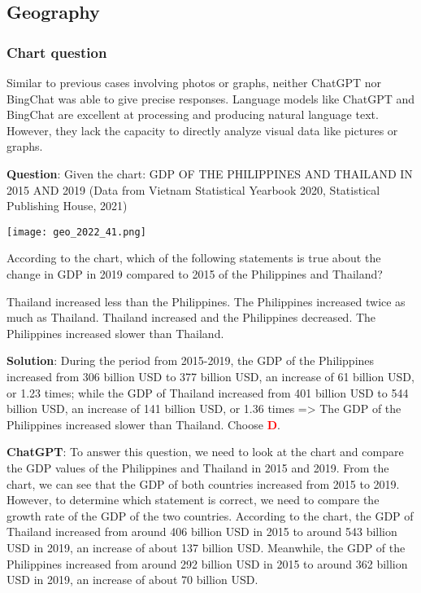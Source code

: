 \documentclass{article}
\begin{document}
{\begin{mdframed}[linewidth=1pt,linecolor=red]
	\end{mdframed}
	
	\subsection{Geography}
	
	\label{VNHSGE_Geo}
	
	\subsubsection{Chart question}
	
	\label{VNHSGE_Geo_Chart}
	
	Similar to previous cases involving photos or graphs, neither ChatGPT nor BingChat was able to give precise responses. Language models like ChatGPT and BingChat are excellent at processing and producing natural language text. However, they lack the capacity to directly analyze visual data like pictures or graphs.
	
	
	\begin{mdframed}[linewidth=1pt,linecolor=red] \textbf{Question}: Given the chart: GDP OF THE PHILIPPINES AND THAILAND IN 2015 AND 2019
		(Data from Vietnam Statistical Yearbook 2020, Statistical Publishing House, 2021)
		
		\texttt{[image: geo\_2022\_41.png]}
		
		According to the chart, which of the following statements is true about the change in GDP in 2019 compared to 2015 of the Philippines and Thailand?
		\begin{choices}
			\choice Thailand increased less than the Philippines.
			\choice The Philippines increased twice as much as Thailand.
			\choice Thailand increased and the Philippines decreased.
			\choice The Philippines increased slower than Thailand.
		\end{choices}
		
		\textbf{Solution}: During the period from 2015-2019, the GDP of the Philippines increased from 306 billion USD to 377 billion USD, an increase of 61 billion USD, or 1.23 times; while the GDP of Thailand increased from 401 billion USD to 544 billion USD, an increase of 141 billion USD, or 1.36 times => The GDP of the Philippines increased slower than Thailand. Choose \textcolor{red}{\textbf{D}}. 
		
		\textbf{ChatGPT}: To answer this question, we need to look at the chart and compare the GDP values of the Philippines and Thailand in 2015 and 2019. From the chart, we can see that the GDP of both countries increased from 2015 to 2019. However, to determine which statement is correct, we need to compare the growth rate of the GDP of the two countries. According to the chart, the GDP of Thailand increased from around 406 billion USD in 2015 to around 543 billion USD in 2019, an increase of about 137 billion USD. Meanwhile, the GDP of the Philippines increased from around 292 billion USD in 2015 to around 362 billion USD in 2019, an increase of about 70 billion USD.
		

\end{mdframed}}
\end{document}
